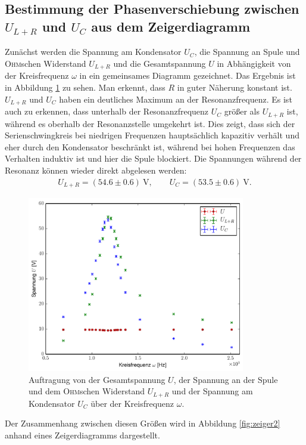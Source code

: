 \documentclass[12pt,a4paper,titlepage,headinclude]{scrartcl}
\numberwithin{equation}{subsection}
\newcommand{\mrm}[1]{\mathrm{#1}}
\newcommand{\person}[1]{\textsc{#1}}
\begin{document}
\subsection{Bestimmung der Phasenverschiebung zwischen $U_{L+R}$ und $U_C$ aus dem Zeigerdiagramm}
\label{sec:zeiger}
Zunächst werden die Spannung am Kondensator $U_C$, die Spannung an Spule und \person{Ohm}schen Widerstand $U_{L+R}$ und die Gesamtspannung $U$ in Abhängigkeit von der Kreisfrequenz $\omega$ in ein gemeinsames Diagramm gezeichnet. Das Ergebnis ist in Abbildung \ref{fig:plot4} zu sehen. Man erkennt, dass $R$ in guter Näherung konstant ist. $U_{L+R}$ und $U_C$ haben ein deutliches Maximum an der Resonanzfrequenz. Es ist auch zu erkennen, dass unterhalb der Resonanzfrequenz $U_C$ größer als $U_{L+R}$ ist, während es oberhalb der Resonanzstelle umgekehrt ist. Dies zeigt, dass sich der Serienschwingkreis bei niedrigen Frequenzen hauptsächlich kapazitiv verhält und eher durch den Kondensator beschränkt ist, während bei hohen Frequenzen das Verhalten induktiv ist und hier die Spule blockiert. Die Spannungen während der Resonanz können wieder direkt abgelesen werden:
\begin{align}
	U_{L+R}=(54.6\pm0.6)~\mrm V,\qquad U_{C}=(53.5\pm0.6)~\mrm V.
	\label{eq:spannungen}
\end{align}
\begin{figure}[h!]
	\centering
	\includegraphics[width=0.85\textwidth]{plot4.pdf}
	\caption{Auftragung von der Gesamtspannung $U$, der Spannung an der Spule und dem \person{Ohm}schen Widerstand $U_{L+R}$ und der Spannung am Kondensator $U_C$ über der Kreisfrequenz $\omega.$} \label{fig:plot4}
\end{figure}
Der Zusammenhang zwischen diesen Größen wird in Abbildung \ref{fig:zeiger2} anhand eines Zeigerdiagramms  dargestellt.
\end{document}
